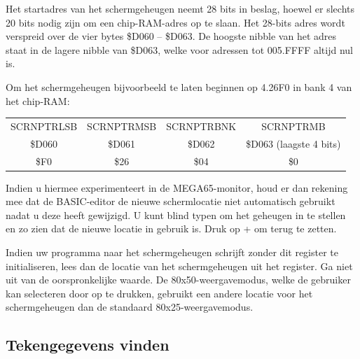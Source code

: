 Het startadres van het schermgeheugen neemt 28 bits in beslag, hoewel er slechts 20 bits nodig zijn om een chip-RAM-adres op te slaan. Het 28-bits adres wordt verspreid over de vier bytes \$D060 -- \$D063. De hoogste nibble van het adres staat in de lagere nibble van \$D063, welke voor adressen tot 005.FFFF altijd nul is.

Om het schermgeheugen bijvoorbeeld te laten beginnen op 4.26F0 in bank 4 van het chip-RAM:

\begin{center}
\begin{tabular}{|c|c|c|c|}
\hline
SCRNPTRLSB & SCRNPTRMSB & SCRNPTRBNK & SCRNPTRMB \\\$D060 & \$D061 & \$D062 & \$D063 (laagste 4 bits) \\
\hline
\$F0 & \$26 & \$04 & \$0 \\
\hline
\end{tabular}
\end{center}


Indien u hiermee experimenteert in de MEGA65-monitor, houd er dan rekening mee dat de BASIC-editor de nieuwe schermlocatie niet automatisch gebruikt nadat u deze heeft gewijzigd. U kunt blind typen om het geheugen in te stellen en zo zien dat de nieuwe locatie in gebruik is. Druk op  +  om terug te zetten.

Indien uw programma naar het schermgeheugen schrijft zonder dit register te initialiseren, lees dan de locatie van het schermgeheugen uit het register. Ga niet uit van de oorspronkelijke waarde. De 80x50-weergavemodus, welke de gebruiker kan selecteren door op   te drukken, gebruikt een andere locatie voor het schermgeheugen dan de standaard 80x25-weergavemodus.

\subsection{Tekengegevens vinden}

